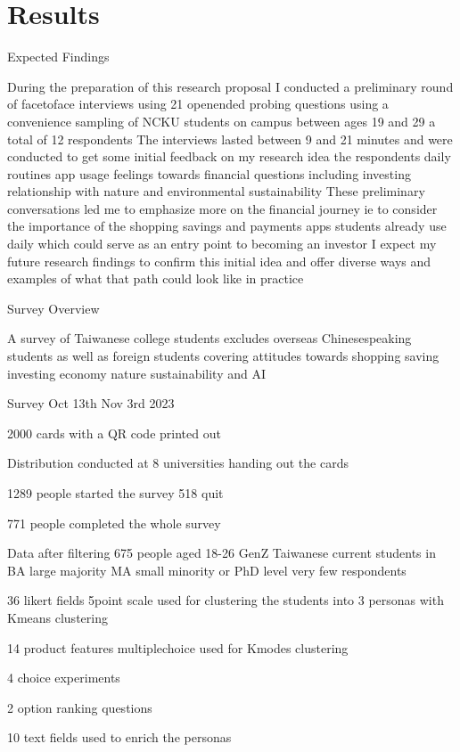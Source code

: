 \documentclass[
  letterpaper,
  DIV=11,
  numbers=noendperiod]{scrartcl}
\begin{document}
\newpage

\section{Results}\label{results}

Expected Findings

During the preparation of this research proposal I conducted a
preliminary round of facetoface interviews using 21 openended probing
questions using a convenience sampling of NCKU students on campus
between ages 19 and 29 a total of 12 respondents The interviews lasted
between 9 and 21 minutes and were conducted to get some initial feedback
on my research idea the respondents daily routines app usage feelings
towards financial questions including investing relationship with nature
and environmental sustainability These preliminary conversations led me
to emphasize more on the financial journey ie to consider the importance
of the shopping savings and payments apps students already use daily
which could serve as an entry point to becoming an investor I expect my
future research findings to confirm this initial idea and offer diverse
ways and examples of what that path could look like in practice

Survey Overview

A survey of Taiwanese college students excludes overseas Chinesespeaking
students as well as foreign students covering attitudes towards shopping
saving investing economy nature sustainability and AI

Survey Oct 13th Nov 3rd 2023

2000 cards with a QR code printed out

Distribution conducted at 8 universities handing out the cards

1289 people started the survey 518 quit

771 people completed the whole survey

Data after filtering 675 people aged 18-26 GenZ Taiwanese current
students in BA large majority MA small minority or PhD level very few
respondents

36 likert fields 5point scale used for clustering the students into 3
personas with Kmeans clustering

14 product features multiplechoice used for Kmodes clustering

4 choice experiments

2 option ranking questions

10 text fields used to enrich the personas
\end{document}
